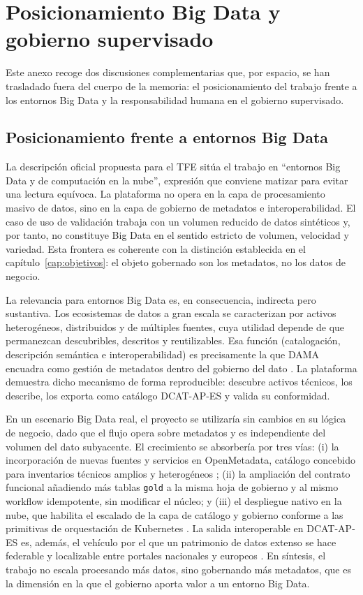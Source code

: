 \chapter{Posicionamiento Big Data y gobierno supervisado}\label{ap:posicionamiento}

Este anexo recoge dos discusiones complementarias que, por espacio, se han trasladado fuera del cuerpo de la memoria: el posicionamiento del trabajo frente a los entornos Big Data y la responsabilidad humana en el gobierno supervisado.

\section{Posicionamiento frente a entornos Big Data}\label{sec:posicionamiento-bigdata}

La descripción oficial propuesta para el TFE sitúa el trabajo en ``entornos Big Data y de computación en la nube'', expresión que conviene matizar para evitar una lectura equívoca. La plataforma no opera en la capa de procesamiento masivo de datos, sino en la capa de gobierno de metadatos e interoperabilidad. El caso de uso de validación trabaja con un volumen reducido de datos sintéticos y, por tanto, no constituye Big Data en el sentido estricto de volumen, velocidad y variedad. Esta frontera es coherente con la distinción establecida en el capítulo~\ref{cap:objetivos}: el objeto gobernado son los metadatos, no los datos de negocio.

La relevancia para entornos Big Data es, en consecuencia, indirecta pero sustantiva. Los ecosistemas de datos a gran escala se caracterizan por activos heterogéneos, distribuidos y de múltiples fuentes, cuya utilidad depende de que permanezcan descubribles, descritos y reutilizables. Esa función (catalogación, descripción semántica e interoperabilidad) es precisamente la que DAMA encuadra como gestión de metadatos dentro del gobierno del dato \cite{damaDmbok}. La plataforma demuestra dicho mecanismo de forma reproducible: descubre activos técnicos, los describe, los exporta como catálogo DCAT-AP-ES y valida su conformidad.

En un escenario Big Data real, el proyecto se utilizaría sin cambios en su lógica de negocio, dado que el flujo opera sobre metadatos y es independiente del volumen del dato subyacente. El crecimiento se absorbería por tres vías: (i) la incorporación de nuevas fuentes y servicios en OpenMetadata, catálogo concebido para inventarios técnicos amplios y heterogéneos \cite{openmetadataDocs}; (ii) la ampliación del contrato funcional añadiendo más tablas \texttt{gold} a la misma hoja de gobierno y al mismo workflow idempotente, sin modificar el núcleo; y (iii) el despliegue nativo en la nube, que habilita el escalado de la capa de catálogo y gobierno conforme a las primitivas de orquestación de Kubernetes \cite{kubernetesConcepts}. La salida interoperable en DCAT-AP-ES es, además, el vehículo por el que un patrimonio de datos extenso se hace federable y localizable entre portales nacionales y europeos \cite{datosGobDcatApEs2025,w3cDcat3}. En síntesis, el trabajo no escala procesando más datos, sino gobernando más metadatos, que es la dimensión en la que el gobierno aporta valor a un entorno Big Data.

